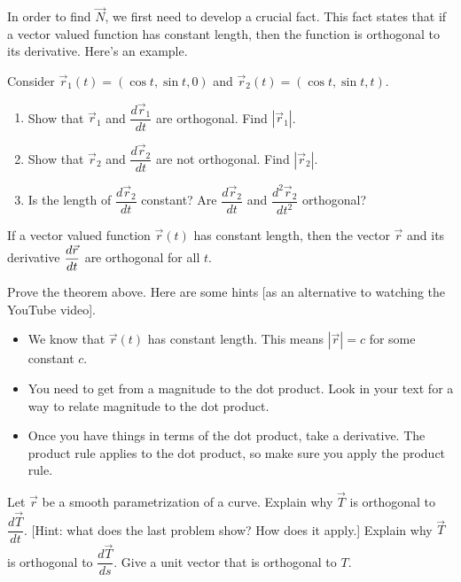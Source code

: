 In order to find $\vec N$, we first need to develop a crucial fact.  This fact states that if a vector valued function has constant length, then the function is orthogonal to its derivative. Here's an example. 

\begin{problem}
 Consider  $\vec r_1(t)=(\cos t, \sin t, 0)$ and $\vec r_2(t)=(\cos t, \sin t, t)$. 
\begin{enumerate}
 \item Show that $\vec r_1$ and $\dfrac{d\vec r_1}{dt}$ are orthogonal. Find $|\vec r_1|$.
 \item Show that $\vec r_2$ and $\dfrac{d\vec r_2}{dt}$ are not orthogonal. Find $|\vec r_2|$.
 \item Is the length of $\dfrac{d\vec r_2}{dt}$ constant? Are $\dfrac{d\vec r_2}{dt}$ and $\dfrac{d^2\vec r_2}{dt^2}$ orthogonal? 
\end{enumerate}
\end{problem}

\begin{theorem}\label{vector valued functions of constant length}
 If a vector valued function $\vec r(t)$ has constant length, then the vector $\vec r$ and its derivative $\displaystyle\frac{d\vec r}{dt}$ are orthogonal for all $t$. 
\end{theorem}

\begin{problem}%
 Prove the theorem above. Here are some hints [as an alternative to watching the YouTube video].
\begin{itemize}
 \item We know that $\vec r(t)$ has constant length. This means $|\vec r|=c$ for some constant $c$. 
 \item You need to get from a magnitude to the dot product. Look in your text for a way to relate magnitude to the dot product.
 \item Once you have things in terms of the dot product, take a derivative. The product rule applies to the dot product, so make sure you apply the product rule.
\end{itemize}
\end{problem}


\begin{problem}\label{T and N are orthogonal}%
 Let $\vec r$ be a smooth parametrization of a curve.  Explain why $\vec T$ is orthogonal to $\dfrac{d\vec T}{dt}$. [Hint: what does the last problem show?  How does it apply.] Explain why $\vec T$ is orthogonal to $\dfrac{d\vec T}{ds}$. Give a unit vector that is orthogonal to $T$.
\end{problem}

